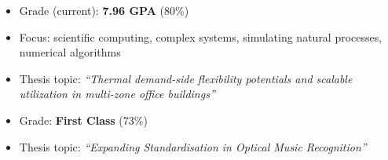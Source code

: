 










\begin{itemize}
    \item Grade (current): \textbf{7.96 GPA} (80\%)
    \item Focus: scientific computing, complex systems, simulating natural processes, numerical algorithms
    \item Thesis topic: \emph{``Thermal demand-side flexibility potentials and scalable utilization in multi-zone office buildings''}
\end{itemize}

\medskip\medskip

\begin{itemize}
    \item Grade: \textbf{First Class} (73\%)
    \item Thesis topic: \emph{``Expanding Standardisation in Optical Music Recognition''}
\end{itemize}

